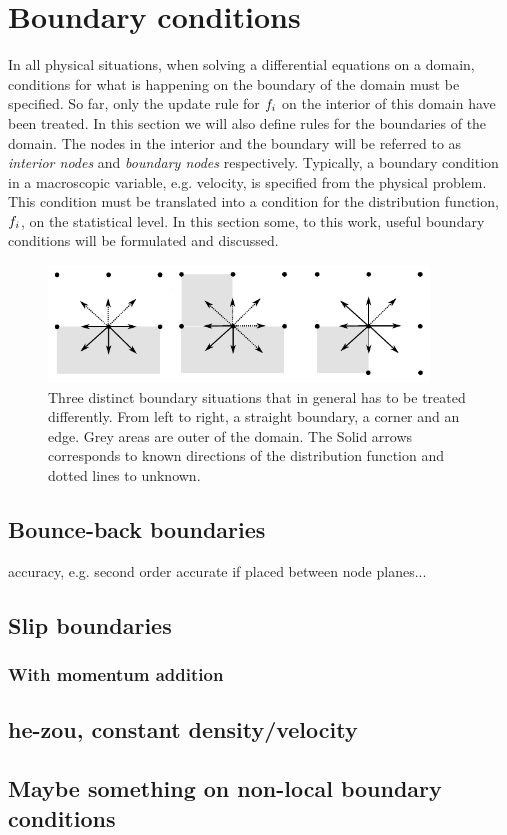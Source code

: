 \section{Boundary conditions}\label{sec:lbm:bound}
In all physical situations, when solving a differential equations on a
domain, conditions for what is happening on the boundary of the domain
must be specified. So far, only the update rule for $f_i$ on the
interior of this domain have been treated. In this section we will
also define rules for the boundaries of the domain. The nodes in the
interior and the boundary will be referred to as \emph{interior nodes}
and \emph{boundary nodes} respectively. Typically, a boundary
condition in a macroscopic variable, e.g. velocity, is specified from
the physical problem. This condition must be translated into a
condition for the distribution function, $f_i$, on the statistical
level. In this section some, to this work, useful boundary conditions
will be formulated and discussed.

\begin{figure}
\begin{center}
\includegraphics[width=0.9\textwidth]{fig/bb.pdf}
\end{center}
\caption{Three distinct boundary situations that in general has to be
  treated differently. From left to right, a straight boundary, a
  corner and an edge. Grey areas are outer of the domain. The Solid
  arrows corresponds to known directions of the distribution function
  and dotted lines to unknown.}
\label{fig:lbm:bounds}
\end{figure}

\subsection{Bounce-back boundaries}\label{sec:lbm:bb}
accuracy, e.g. second order accurate if placed between node planes...

\subsection{Slip boundaries}\label{sec:lbm:mirror}

\subsubsection{With momentum addition}\label{sec:lbm:mod_mirror}

\subsection{he-zou, constant density/velocity}\label{sec:lbm:hezou}

\subsection{Maybe something on non-local boundary conditions}
